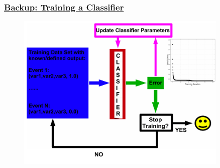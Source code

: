 \documentclass[xcolor=table, xcolor=dvipsnames]{beamer}
\begin{document}
\begin{frame}
 \frametitle{\hyperlink{bup}{Backup: Training a Classifier}}
 \label{train}
 \footnotesize
 
 \begin{figure}
   \includegraphics[width=0.9\textwidth]{training_example.pdf}
 \end{figure}
\end{frame}
\end{document}
